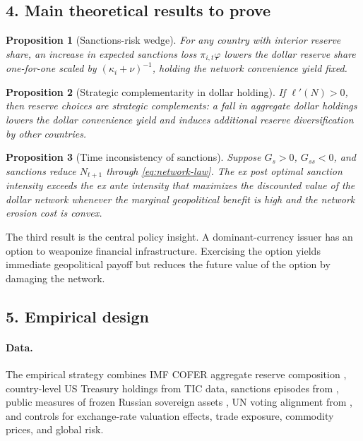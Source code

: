 \documentclass[11pt]{article}
\newtheorem{proposition}{Proposition}
\begin{document}
\subsection*{4. Main theoretical results to prove}
\begin{proposition}[Sanctions-risk wedge]
For any country with interior reserve share, an increase in expected sanctions loss $\pi_{i,t}\varphi$ lowers the dollar reserve share one-for-one scaled by $(\kappa_i+\nu)^{-1}$, holding the network convenience yield fixed.
\end{proposition}

\begin{proposition}[Strategic complementarity in dollar holding]
If $\ell'(N)>0$, then reserve choices are strategic complements: a fall in aggregate dollar holdings lowers the dollar convenience yield and induces additional reserve diversification by other countries.
\end{proposition}

\begin{proposition}[Time inconsistency of sanctions]
Suppose $G_s>0$, $G_{ss}<0$, and sanctions reduce $N_{t+1}$ through \eqref{eq:network-law}. The ex post optimal sanction intensity exceeds the ex ante intensity that maximizes the discounted value of the dollar network whenever the marginal geopolitical benefit is high and the network erosion cost is convex.
\end{proposition}

The third result is the central policy insight. A dominant-currency issuer has an option to weaponize financial infrastructure. Exercising the option yields immediate geopolitical payoff but reduces the future value of the option by damaging the network.

\subsection*{5. Empirical design}
\paragraph{Data.} The empirical strategy combines IMF COFER aggregate reserve composition \citep{IMFCOFER}, country-level US Treasury holdings from TIC data, sanctions episodes from \citet{FelbermayrEtAl2020}, public measures of frozen Russian sovereign assets \citep{BrookingsRussiaAssets2025}, UN voting alignment from \citet{BaileyStrezhnevVoeten2017}, and controls for exchange-rate valuation effects, trade exposure, commodity prices, and global risk.
\end{document}
